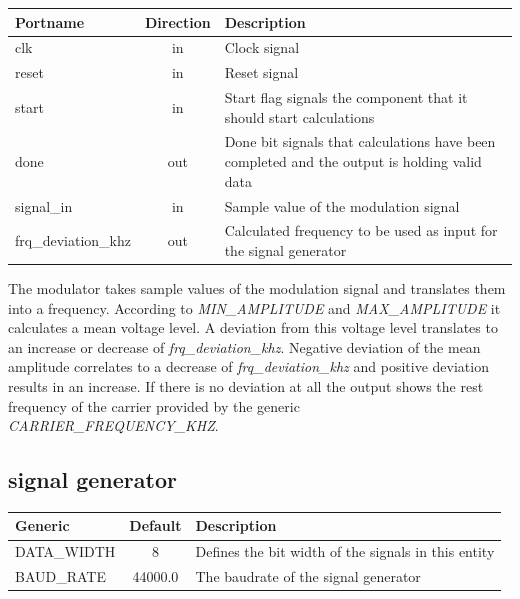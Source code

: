 \begin{center}
	\begin{tabular}{ | l | c | l | }
		\hline
		\textbf{Portname} & \textbf{Direction} & \textbf{Description} \\
		\hline
		clk & in & Clock signal \\
		reset & in  & Reset signal \\
		start & in  & Start flag signals the component that it should start calculations \\
		done & out  & Done bit signals that calculations have been completed and the output is holding valid data \\
		signal\_in & in  & Sample value of the modulation signal \\
		frq\_deviation\_khz & out  & Calculated frequency to be used as input for the signal generator \\
		\hline
	\end{tabular} 
\end{center}

The modulator takes sample values of the modulation signal and translates them into a frequency. According to \textit{MIN\_AMPLITUDE} and \textit{MAX\_AMPLITUDE} it calculates a mean voltage level. A deviation from this voltage level translates to an increase or decrease of \textit{frq\_deviation\_khz}. Negative deviation of the mean amplitude correlates to a decrease of \textit{frq\_deviation\_khz} and positive deviation results in an increase. If there is no deviation at all the output shows the rest frequency of the carrier provided by the generic \textit{CARRIER\_FREQUENCY\_KHZ}.

\subsection{signal generator}

\begin{center}
	\begin{tabular}{ | l | c | l | }
		\hline
		\textbf{Generic} & \textbf{Default} & \textbf{Description} \\ \hline
		DATA\_WIDTH & 8 & Defines the bit width of the signals in this entity \\
		BAUD\_RATE & 44000.0 & The baudrate of the signal generator \\
		\hline
	\end{tabular} 
\end{center}

